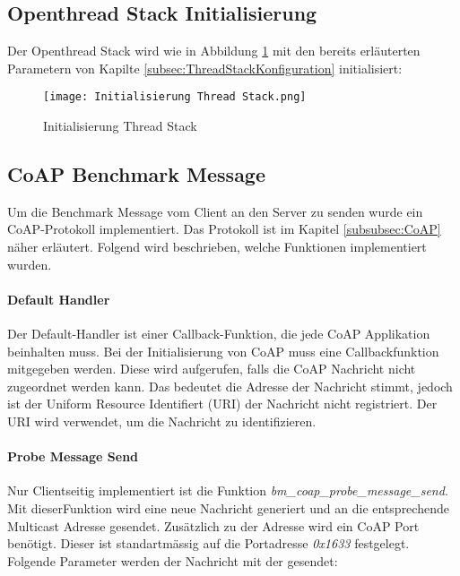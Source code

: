 \subsection{Openthread Stack Initialisierung}\label{subsec:OpenthreadStackInitialisierun}
Der Openthread Stack wird wie in Abbildung \ref{fig:InitialisierungThreadStack} mit den bereits erläuterten Parametern von Kapilte \ref{subsec:ThreadStackKonfiguration} initialisiert:

\begin{figure}[H]
	\centering
	\texttt{[image: Initialisierung Thread Stack.png]}
	\caption{Initialisierung Thread Stack}\label{fig:InitialisierungThreadStack}
\end{figure}

\newpage
\subsection{CoAP Benchmark Message}\label{subsec:ThreadBenchmarkMessage}
Um die Benchmark Message vom Client an den Server zu senden wurde ein CoAP-Protokoll implementiert. Das Protokoll ist im Kapitel \ref{subsubsec:CoAP} näher erläutert. Folgend wird beschrieben, welche Funktionen implementiert wurden.

\paragraph{Default Handler} 
Der Default-Handler ist einer Callback-Funktion, die jede CoAP Applikation beinhalten muss. Bei der Initialisierung von CoAP muss eine Callbackfunktion mitgegeben werden. Diese wird aufgerufen, falls die CoAP Nachricht nicht zugeordnet werden kann. Das bedeutet die Adresse der Nachricht stimmt, jedoch ist der Uniform Resource Identifiert (URI) der Nachricht nicht registriert. Der URI wird verwendet, um die Nachricht zu identifizieren. 

\paragraph{Probe Message Send}
Nur Clientseitig implementiert ist die Funktion \textit{bm\_coap\_probe\_message\_send}. Mit dieser\linebreak Funktion wird eine neue Nachricht generiert und an die entsprechende Multicast Adresse gesendet. Zusätzlich zu der Adresse wird ein CoAP Port benötigt. Dieser ist standartmässig auf die Portadresse \textit{0x1633} festgelegt. Folgende Parameter werden der Nachricht mit der gesendet:

